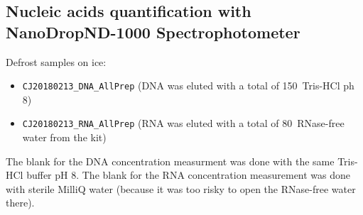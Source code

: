 \subsection{Nucleic acids quantification with NanoDrop\cR ND-1000 Spectrophotometer}
\label{task:20180213_cj2}

Defrost samples on ice:
\begin{itemize}
\item \texttt{CJ20180213\_DNA\_AllPrep} (DNA was eluted with a total of 150~\uL Tris-HCl ph 8)
\item \texttt{CJ20180213\_RNA\_AllPrep} (RNA was eluted with a total of 80~\uL RNase-free water from the kit)
\end{itemize}

The blank for the DNA concentration measurment was done with the same Tris-HCl buffer pH 8. The blank for the RNA concentration measurement was done with sterile MilliQ water (because it was too risky to open the RNase-free water there).

